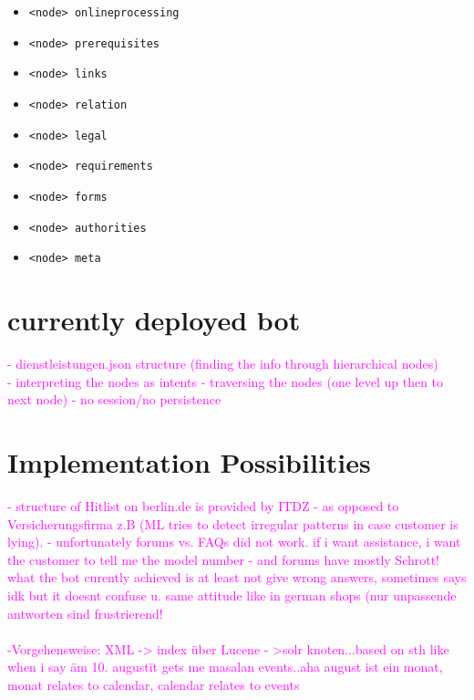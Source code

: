 \begin{itemize}
\begin{itemize}
		\item \lstinline|<node> onlineprocessing|
		\item \lstinline|<node> prerequisites|
		\item \lstinline|<node> links|
		\item \lstinline|<node> relation|
		\item \lstinline|<node> legal|
		\item \lstinline|<node> requirements|
		\item \lstinline|<node> forms|
		\item \lstinline|<node> authorities|
		\item \lstinline|<node> meta|										
	\end{itemize}
\end{itemize}

\section{currently deployed bot}


\textcolor{magenta}{
- dienstleistungen.json structure (finding the info through hierarchical nodes)\\
- interpreting the nodes as intents
- traversing the nodes (one level up then to next node)
- no session/no persistence
%
}

\section{Implementation Possibilities}

\textcolor{magenta}{
- structure of Hitlist on berlin.de  is provided by ITDZ -  as opposed to Versicherungsfirma z.B (ML tries to detect irregular patterns in case customer is lying).
- unfortunately forums vs. FAQs did not work. if i want assistance, i want the customer to tell me the model number - and forums have mostly Schrott!\\
what the bot curently achieved is at least not give wrong answers, sometimes says idk but it doesnt confuse u. same attitude like in german shops (nur unpassende antworten sind frustrierend!\\
\\
-Vorgehensweise: XML -> index \"uber Lucene - >solr knoten...based on sth like when i say \" am 10. august\" it gets me masalan events..aha august ist ein monat, monat relates to calendar, calendar relates to events
}
